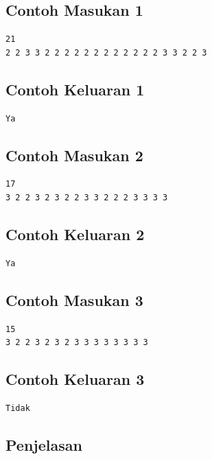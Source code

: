 \documentclass{article}
\begin{document}
\subsection*{Contoh Masukan 1}

\begin{lstlisting}
21
2 2 3 3 2 2 2 2 2 2 2 2 2 2 2 2 3 3 2 2 3
\end{lstlisting}

\subsection*{Contoh Keluaran 1}

\begin{lstlisting}
Ya
\end{lstlisting}


\subsection*{Contoh Masukan 2}

\begin{lstlisting}
17
3 2 2 3 2 3 2 2 3 3 2 2 2 3 3 3 3
\end{lstlisting}

\subsection*{Contoh Keluaran 2}

\begin{lstlisting}
Ya
\end{lstlisting}

\subsection*{Contoh Masukan 3}

\begin{lstlisting}
15
3 2 2 3 2 3 2 3 3 3 3 3 3 3 3
\end{lstlisting}

\subsection*{Contoh Keluaran 3}

\begin{lstlisting}
Tidak
\end{lstlisting}


\subsection*{Penjelasan}
\end{document}
